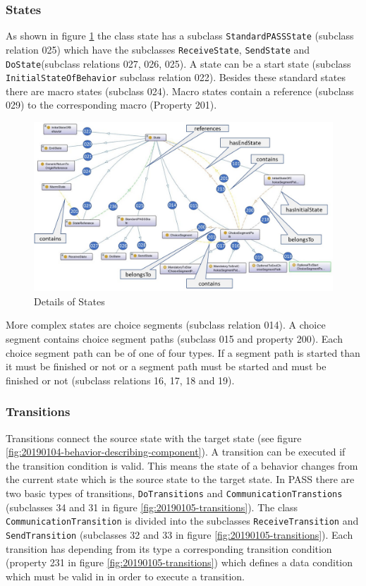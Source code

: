 \subsubsection{States}

As shown in figure \ref{fig:20190109-states} the class state has a subclass \texttt{StandardPASSState} (subclass relation 025) which have the subclasses \texttt{ReceiveState}, \texttt{SendState} and \texttt{DoState}(subclass relations 027, 026, 025). A state can be a start state (subclass \texttt{InitialStateOfBehavior} subclass relation 022). Besides these standard states there are macro states (subclass 024). Macro states contain a reference (subclass 029) to the corresponding macro (Property 201).

\begin{figure}[htbp]
	\centering
	\includegraphics[width=1.0\linewidth]{Figures/Ontology/SubjectExecution/20190109-States}
	\caption[Details of States]{Details of States}
	\label{fig:20190109-states}
\end{figure}

More complex states are choice segments (subclass relation 014). A choice segment contains choice segment paths (subclass 015 and property 200). Each choice segment path can be of one of four types. If a segment path is started than it must be finished or not or a segment path must be started and must be finished or not (subclass relations 16, 17, 18 and 19).

\subsubsection{Transitions}

Transitions connect the source state with the target state (see figure \ref{fig:20190104-behavior-describing-component}). A transition can be executed if the transition condition is valid. This means the state of a behavior changes from the current state which is the source state to the target state. In PASS there are two basic types of transitions, \texttt{DoTransitions} and \texttt{CommunicationTranstions} (subclasses 34 and 31 in figure \ref{fig:20190105-transitions}). The class \texttt{CommunicationTransition} is divided into the subclasses \texttt{ReceiveTransition} and \texttt{SendTransition} (subclasses 32 and 33 in figure \ref{fig:20190105-transitions}). Each transition has depending from its type a corresponding transition condition (property 231 in figure  \ref{fig:20190105-transitions}) which defines a data condition which must be valid in in order to execute a transition.

